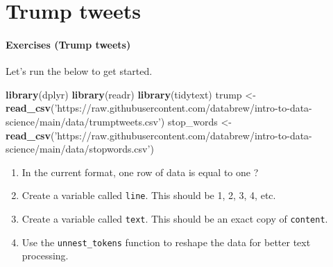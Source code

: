 \documentclass[
]{book}
\newenvironment{Shaded}{\begin{snugshade}}{\end{snugshade}}
\newcommand{\KeywordTok}[1]{\textcolor[rgb]{0.13,0.29,0.53}{\textbf{#1}}}
\newcommand{\NormalTok}[1]{#1}
\newcommand{\OperatorTok}[1]{\textcolor[rgb]{0.81,0.36,0.00}{\textbf{#1}}}
\newcommand{\StringTok}[1]{\textcolor[rgb]{0.31,0.60,0.02}{#1}}
\begin{document}
\hypertarget{trump}{%
\chapter{Trump tweets}\label{trump}}

\hypertarget{exercises-trump-tweets}{%
\subsubsection*{Exercises (Trump tweets)}\label{exercises-trump-tweets}}

Let's run the below to get started.

\begin{Shaded}
\begin{Highlighting}[]

\KeywordTok{library}\NormalTok{(dplyr)}
\KeywordTok{library}\NormalTok{(readr)}
\KeywordTok{library}\NormalTok{(tidytext)}
\NormalTok{trump <-}\StringTok{ }\KeywordTok{read_csv}\NormalTok{(}\StringTok{'https://raw.githubusercontent.com/databrew/intro-to-data-science/main/data/trumptweets.csv'}\NormalTok{)}
\NormalTok{stop_words <-}\StringTok{ }\KeywordTok{read_csv}\NormalTok{(}\StringTok{'https://raw.githubusercontent.com/databrew/intro-to-data-science/main/data/stopwords.csv'}\NormalTok{)}
\end{Highlighting}
\end{Shaded}

\begin{enumerate}
\def\labelenumi{\arabic{enumi}.}
\item
  In the current format, one row of data is equal to one ?
\item
  Create a variable called \texttt{line}. This should be 1, 2, 3, 4, etc.
\item
  Create a variable called \texttt{text}. This should be an exact copy of \texttt{content}.
\item
  Use the \texttt{unnest\_tokens} function to reshape the data for better text processing.
\end{enumerate}

\begin{Shaded}
\end{Shaded}
\end{document}
